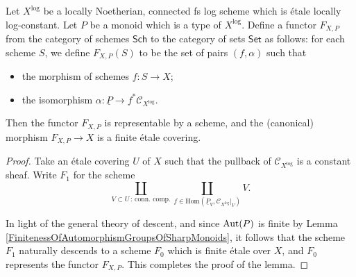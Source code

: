 \begin{lem}\label{RepresentabilityOfFunctorOfTrivializationsOfCharacteristicOfEtaleLocallyLogConstantLogSchemes}
  Let $X^\log$ be a locally Noetherian, connected fs log scheme which is \'{e}tale locally log-constant. Let $P$ be a monoid which is a type of $X^\log$. Define a functor $F_{X, P}$ from the category of schemes $\mathsf{Sch}$ to the category of sets $\mathsf{Set}$ as follows: for each scheme $S$, we define $F_{X, P}(S)$ to be the set of pairs $(f, \alpha)$ such that
  \begin{itemize}
    \item the morphism of schemes $f \colon S \to X$;
    \item the isomorphism $\alpha \colon \underline{P} \to f^*\mathcal{C}_{X^\log}$.
  \end{itemize}
  Then the functor $F_{X, P}$ is representable by a scheme, and the (canonical) morphism $F_{X, P} \to X$ is a finite \'{e}tale covering.
\end{lem}
\begin{proof}
  Take an \'{e}tale covering $U$ of $X$ such that the pullback of $\mathcal{C}_{X^\log}$ is a constant sheaf. Write $F_1$ for the scheme \[\coprod_{V \subset U \, : \, \text{conn. comp.}} \coprod_{f \in \mathrm{Hom}(\underline{P}_V, \mathcal{C}_{X^\log}|_V)} V. \]

  In light of the general theory of descent, and since $\mathrm{Aut}(P)$ is finite by Lemma \ref{FinitenessOfAutomorphismGroupsOfSharpMonoids}, it follows that the scheme $F_1$ naturally descends to a scheme $F_0$ which is finite \'{e}tale over $X$, and $F_0$ represents the functor $F_{X, P}$. This completes the proof of the lemma.
\end{proof}

